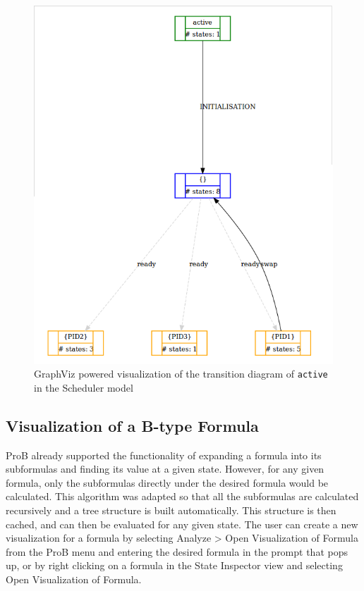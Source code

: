 \begin{center}
\begin{figure}[h!]
\centering
\includegraphics[width=14cm]{bilder/transdiag-dotty-wo.png}
\caption{GraphViz powered visualization of the transition diagram of \texttt{active} in the Scheduler model}
\label{transdiagDotty}
\end{figure}
\end{center}

\subsection{Visualization of a B-type Formula}

ProB already supported the functionality of expanding a formula into its subformulas and finding its value at a given state. However, for any given formula, only the subformulas directly under the desired formula would be calculated. This algorithm was adapted so that all the subformulas are calculated recursively and a tree structure is built automatically. This structure is then cached, and can then be evaluated for any given state. The user can create a new visualization for a formula by selecting \textsf{Analyze > Open Visualization of Formula} from the \textsf{ProB} menu and entering the desired formula in the prompt that pops up, or by right clicking on a formula in the \textsf{State Inspector} view and selecting \textsf{Open Visualization of Formula}.

